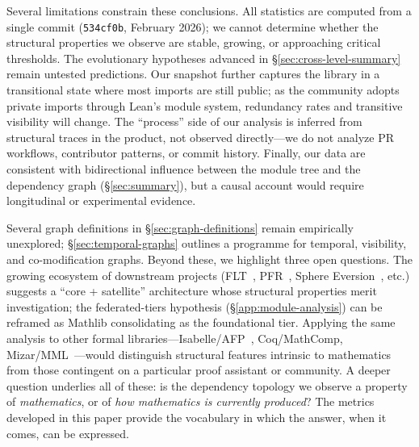 \label{sec:limitations}
Several limitations constrain these conclusions. All statistics are computed from a single commit (\texttt{534cf0b}, February 2026); we cannot determine whether the structural properties we observe are stable, growing, or approaching critical thresholds. The evolutionary hypotheses advanced in \S\ref{sec:cross-level-summary} remain untested predictions. Our snapshot further captures the library in a transitional state where most imports are still public; as the community adopts private imports through Lean's module system, redundancy rates and transitive visibility will change. The ``process'' side of our analysis is inferred from structural traces in the product, not observed directly---we do not analyze PR workflows, contributor patterns, or commit history. Finally, our data are consistent with bidirectional influence between the module tree and the dependency graph (\S\ref{sec:summary}), but a causal account would require longitudinal or experimental evidence.

\label{sec:future}
Several graph definitions in \S\ref{sec:graph-definitions} remain empirically unexplored; \S\ref{sec:temporal-graphs} outlines a programme for temporal, visibility, and co-modification graphs. Beyond these, we highlight three open questions. The growing ecosystem of downstream projects (FLT~\cite{flt_lean}, PFR~\cite{pfr_lean}, Sphere Eversion~\cite{sphere_eversion}, etc.) suggests a ``core + satellite'' architecture whose structural properties merit investigation; the federated-tiers hypothesis (\S\ref{app:module-analysis}) can be reframed as Mathlib consolidating as the foundational tier. Applying the same analysis to other formal libraries---Isabelle/AFP~\cite{blanchette2015,klein2012}, Coq/MathComp, Mizar/MML~\cite{bancerek2018}---would distinguish structural features intrinsic to mathematics from those contingent on a particular proof assistant or community. A deeper question underlies all of these: is the dependency topology we observe a property of \emph{mathematics}, or of \emph{how mathematics is currently produced}? The metrics developed in this paper provide the vocabulary in which the answer, when it comes, can be expressed.
